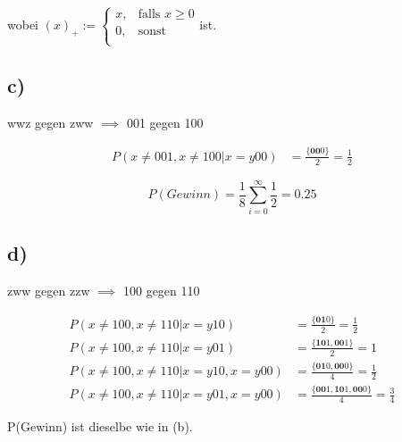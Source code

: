 \documentclass{article}
\begin{document}
wobei  $(x)_+ :=  \begin{cases}
       			x , &\text{falls }  x \geq 0 \\
       			0 , &\text{sonst} \\
     			\end{cases}
	 $ist.



\subsection*{c)}
wwz gegen zww $\implies$ 001 gegen 100


\begin{align*}
P(x \neq 001 , x \neq 100 | x = y00) &= \frac{ \{ \textbf{00}0 \} }{ 2 } = \frac{1}{2} 
\end{align*}

\[ P(Gewinn) =  \frac{1}{8}  \sum_{i=0}^{\infty} \frac{1}{2} = 0.25 \]

\subsection*{d)}
zww gegen zzw $\implies$ 100 gegen 110


\begin{align*}
P(x \neq 100 , x \neq 110 | x = y10) &= \frac{ \{ \textbf{01}0 \} }{ 2 } = \frac{1}{2} \\
P(x \neq 100 , x \neq 110 | x = y01) &= \frac{ \{ \textbf{10}1 , \textbf{00}1 \} }{ 2 } = 1\\
P(x \neq 100 , x \neq 110 | x = y10 , x = y00) &= \frac{ \{ \textbf{01}0 , \textbf{00}0 \} }{ 4 } = \frac{1}{2}\\
P(x \neq 100 , x \neq 110 | x = y01 , x = y00) &= \frac{ \{ \textbf{00}1 , \textbf{10}1 , \textbf{00}0 \} }{ 4 } = \frac{3}{4}
\end{align*}

P(Gewinn) ist dieselbe wie in (b).
\end{document}

